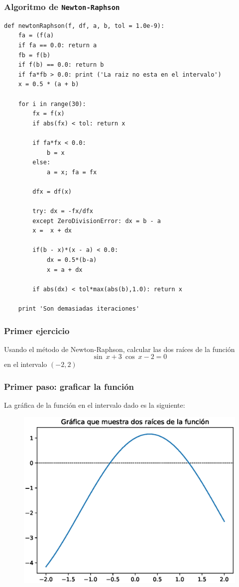 \begin{frame}
\frametitle{Algoritmo de \texttt{Newton-Raphson}}
\begin{lstlisting}[caption=Código del método N-R, style=FormattedNumber, basicstyle=\linespread{1.1}\ttfamily=\small, columns=fullflexible]
def newtonRaphson(f, df, a, b, tol = 1.0e-9):
    fa = (f(a)
    if fa == 0.0: return a
    fb = f(b)
    if f(b) == 0.0: return b
    if fa*fb > 0.0: print ('La raiz no esta en el intervalo')
    x = 0.5 * (a + b)

    for i in range(30):
        fx = f(x)
        if abs(fx) < tol: return x

        if fa*fx < 0.0:
            b = x
        else:
            a = x; fa = fx

        dfx = df(x)
        
        try: dx = -fx/dfx
        except ZeroDivisionError: dx = b - a
        x =  x + dx
        
        if(b - x)*(x - a) < 0.0:
            dx = 0.5*(b-a)
            x = a + dx
        
        if abs(dx) < tol*max(abs(b),1.0): return x
    
    print 'Son demasiadas iteraciones'
\end{lstlisting}
\end{frame}
\begin{frame}
\frametitle{Primer ejercicio}
Usando el método de Newton-Raphson, calcular las dos raíces de la función
\[ \sin \: x + 3 \: \cos \: x - 2 = 0  \]
en el intervalo $(-2, 2)$
\end{frame}
\begin{frame}
\frametitle{Primer paso: graficar la función}
La gráfica de la función en el intervalo dado es la siguiente:
\begin{figure}
	\centering
	\includegraphics[scale=0.5]{Imagenes/Ejercicio_NR_Seno_01.eps}
\end{figure}
\end{frame}
